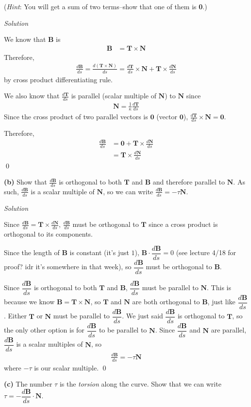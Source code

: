 \documentclass{article}
\newcommand{\T}[0]{\mathbf{T}}
\newcommand{\N}[0]{\mathbf{N}}
\newcommand{\B}[0]{\mathbf{B}}
\newcommand{\Solution}{\textit{Solution}}
\begin{document}
(\textit{Hint}: You will get a sum of two terms--show that one of them is \textbf{0}.) 

\Solution

We know that $\B$ is
\begin{align*}
    \B&=\T\times \N
\end{align*}
Therefore,
\begin{align*}
    \frac{d\B}{ds}=\frac{d(\T\times\N)}{ds}=\frac{d\T}{ds}\times \N + \T\times\frac{d\N}{ds}
\end{align*}
by cross product differentiating rule.

We also know that $\displaystyle \frac{d\T}{ds}$ is parallel (scalar multiple of $\N$) to $\N$ since
\begin{align*}
    \N=\frac{1}{\kappa}\frac{d\T}{ds}
\end{align*}
Since the cross product of two parallel vectors is $\mathbf{0}$ (vector $\mathbf{0}$), $\displaystyle \frac{d\T}{ds}\times \N=\mathbf{0}$.

Therefore,
\begin{align*}
    \frac{d\B}{ds}&=\mathbf{0}+\T\times\frac{d\N}{ds}\\
    &=\T\times\frac{d\N}{ds}
\end{align*}
\qed

{}\textbf{(b)} Show that $\displaystyle \frac{d\B}{ds}$ is orthogonal to both $\T$ and $\B$ and therefore parallel to $\N$. As such, $\displaystyle \frac{d\B}{ds}$ is a scalar multiple of $\N$, so we can write $\displaystyle\frac{d\B}{ds}=-\tau\N$.

\Solution

Since $\displaystyle \frac{d\B}{ds}=\T\times \frac{d\N}{ds}$, $\displaystyle \frac{d\B}{ds}$ must be orthogonal to $\T$ since a cross product is orthogonal to its components.

Since the length of $\B$ is constant (it's just $1$), $\B \cdot \dfrac{d\B}{ds}=0$ (see lecture 4/18 for proof? idr it's somewhere in that week), so $\dfrac{d\B}{ds}$ must be orthogonal to $\B$.

Since $\dfrac{d\B}{ds}$ is orthogonal to both $\T$ and $\B$, $\dfrac{d\B}{ds}$ must be parallel to $\N$. This is because we know $\B = \T\times \N$, so $\T$ and $\N$ are both orthogonal to $\B$, just like $\dfrac{d\B}{ds}$. Either $\T$ or $\N$ must be parallel to $\dfrac{d\B}{ds}$. We just said $\dfrac{d\B}{ds}$ is orthogonal to $\T$, so the only other option is for $\dfrac{d\B}{ds}$ to be parallel to $\N$. Since $\dfrac{d\B}{ds}$ and $\N$ are parallel, $\dfrac{d\B}{ds}$ is a scalar multiples of $\N$, so
\begin{align*}
    \frac{d\B}{ds}=-\tau \N
\end{align*}
where $-\tau$ is our scalar multiple.
\qed
\newpage
{}
{}\textbf{(c)} The number $\tau$ is the \textit{torsion} along the curve. Show that we can write $\tau =-\dfrac{d\B}{ds}\cdot\N$.
\end{document}
